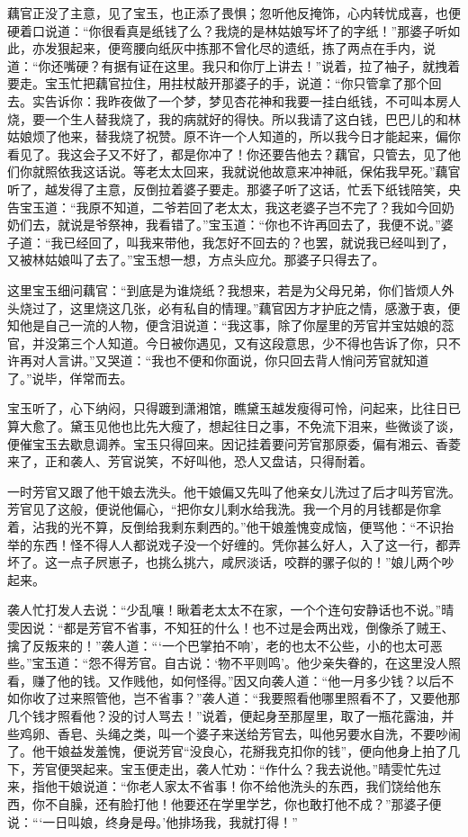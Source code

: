 \documentclass[12pt,oneside]{book}
\begin{document}
藕官正没了主意，见了宝玉，也正添了畏惧；忽听他反掩饰，心内转忧成喜，也便硬着口说道：“你很看真是纸钱了么？我烧的是林姑娘写坏了的字纸！”那婆子听如此，亦发狠起来，便弯腰向纸灰中拣那不曾化尽的遗纸，拣了两点在手内，说道：“你还嘴硬？有据有证在这里。我只和你厅上讲去！”说着，拉了袖子，就拽着要走。宝玉忙把藕官拉住，用拄杖敲开那婆子的手，说道：“你只管拿了那个回去。实告诉你：我昨夜做了一个梦，梦见杏花神和我要一挂白纸钱，不可叫本房人烧，要一个生人替我烧了，我的病就好的得快。所以我请了这白钱，巴巴儿的和林姑娘烦了他来，替我烧了祝赞。原不许一个人知道的，所以我今日才能起来，偏你看见了。我这会子又不好了，都是你冲了！你还要告他去？藕官，只管去，见了他们你就照依我这话说。等老太太回来，我就说他故意来冲神祇，保佑我早死。”藕官听了，越发得了主意，反倒拉着婆子要走。那婆子听了这话，忙丢下纸钱陪笑，央告宝玉道：“我原不知道，二爷若回了老太太，我这老婆子岂不完了？我如今回奶奶们去，就说是爷祭神，我看错了。”宝玉道：“你也不许再回去了，我便不说。”婆子道：“我已经回了，叫我来带他，我怎好不回去的？也罢，就说我已经叫到了，又被林姑娘叫了去了。”宝玉想一想，方点头应允。那婆子只得去了。

这里宝玉细问藕官：“到底是为谁烧纸？我想来，若是为父母兄弟，你们皆烦人外头烧过了，这里烧这几张，必有私自的情理。”藕官因方才护庇之情，感激于衷，便知他是自己一流的人物，便含泪说道：“我这事，除了你屋里的芳官并宝姑娘的蕊官，并没第三个人知道。今日被你遇见，又有这段意思，少不得也告诉了你，只不许再对人言讲。”又哭道：“我也不便和你面说，你只回去背人悄问芳官就知道了。”说毕，佯常而去。

宝玉听了，心下纳闷，只得踱到潇湘馆，瞧黛玉越发瘦得可怜，问起来，比往日已算大愈了。黛玉见他也比先大瘦了，想起往日之事，不免流下泪来，些微谈了谈，便催宝玉去歇息调养。宝玉只得回来。因记挂着要问芳官那原委，偏有湘云、香菱来了，正和袭人、芳官说笑，不好叫他，恐人又盘诘，只得耐着。

一时芳官又跟了他干娘去洗头。他干娘偏又先叫了他亲女儿洗过了后才叫芳官洗。芳官见了这般，便说他偏心，“把你女儿剩水给我洗。我一个月的月钱都是你拿着，沾我的光不算，反倒给我剩东剩西的。”他干娘羞愧变成恼，便骂他：“不识抬举的东西！怪不得人人都说戏子没一个好缠的。凭你甚么好人，入了这一行，都弄坏了。这一点子屄崽子，也挑么挑六，咸屄淡话，咬群的骡子似的！”娘儿两个吵起来。

袭人忙打发人去说：“少乱嚷！瞅着老太太不在家，一个个连句安静话也不说。”晴雯因说：“都是芳官不省事，不知狂的什么！也不过是会两出戏，倒像杀了贼王、擒了反叛来的！”袭人道：“‘一个巴掌拍不响’，老的也太不公些，小的也太可恶些。”宝玉道：“怨不得芳官。自古说：‘物不平则鸣’。他少亲失眷的，在这里没人照看，赚了他的钱。又作贱他，如何怪得。”因又向袭人道：“他一月多少钱？以后不如你收了过来照管他，岂不省事？”袭人道：“我要照看他哪里照看不了，又要他那几个钱才照看他？没的讨人骂去！”说着，便起身至那屋里，取了一瓶花露油，并些鸡卵、香皂、头绳之类，叫一个婆子来送给芳官去，叫他另要水自洗，不要吵闹了。他干娘益发羞愧，便说芳官“没良心，花掰我克扣你的钱”，便向他身上拍了几下，芳官便哭起来。宝玉便走出，袭人忙劝：“作什么？我去说他。”晴雯忙先过来，指他干娘说道：“你老人家太不省事！你不给他洗头的东西，我们饶给他东西，你不自臊，还有脸打他！他要还在学里学艺，你也敢打他不成？”那婆子便说：“‘一日叫娘，终身是母。’他排场我，我就打得！”
\end{document}
